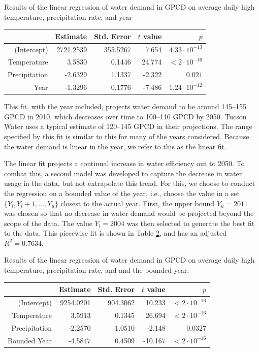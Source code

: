 \documentclass[opre,nonblindrev]{informs3} %
\begin{document}
\begin{table}
	\TABLE
	{
		Results of the linear regression of water demand in GPCD on average daily high temperature, precipitation rate, and year
		\label{tb:gpcd_linear_reg}
	}
	{\begin{tabular}{rrrrr}
		\hline
						   & Estimate  & Std. Error & $t$ value & $p$ \\
		\hline
		(Intercept)    & 2721.2539 & 355.5267   & 7.654     & $4.33\cdot 10^{-13}$ \\
		Temperature    &   3.5830  & 0.1446     & 24.774    & $< 2\cdot 10^{-16}$\\
		Precipitation  &  -2.6329  & 1.1337     & -2.322    & $0.021$ \\
		Year           &  -1.3296  & 0.1776     & -7.486    & $1.24\cdot 10^{-12}$ \\
		\hline
	\end{tabular}}
	{}
\end{table}

This fit, with the year included, projects water demand to be around 145--155 GPCD in 2010, which decreases over time to 100--110 GPCD by 2050.
Tucson Water uses a typical estimate of 120--145 GPCD in their projections.
The range specified by this fit is similar to this for many of the years considered.
Because the water demand is linear in the year, we refer to this as the linear fit.

The linear fit projects a continual increase in water efficiency out to 2050.
To combat this, a second model was developed to capture the decrease in water usage in the data, but not extrapolate this trend.
For this, we choose to conduct the regression on a bounded value of the year, i.e., choose the value in a set $\{Y_l, Y_l+1, \dots, Y_u\}$ closest to the actual year.
First, the upper bound $Y_u = 2011$ was chosen so that no decrease in water demand would be projected beyond the scope of the data.
The value $Y_l = 2004$ was then selected to generate the best fit to the data.
This piecewise fit is shown in Table \ref{tb:gpcd_piecewise_reg}, and has an adjusted $R^2 = 0.7634$.

\begin{table}
	\TABLE
	{
		Results of the linear regression of water demand in GPCD on average daily high temperature, precipitation rate, and and the bounded year.
		\label{tb:gpcd_piecewise_reg}
	}
	{\begin{tabular}{rrrrr}
		\hline
						   & Estimate  & Std. Error & $t$ value & $p$ \\
		\hline
		(Intercept)    & 9254.0201 & 904.3062   & 10.233    & $<2\cdot 10^{-16}$ \\
		Temperature    & 3.5913    & 0.1345     & 26.694    & $<2\cdot 10^{-16}$ \\
		Precipitation  & -2.2570   & 1.0510     & -2.148    & $0.0327$ \\
		Bounded Year   & -4.5847   & 0.4509     & -10.167   & $<2\cdot 10^{-16}$ \\
		\hline
	\end{tabular}}
	{}
\end{table}
\end{document}

